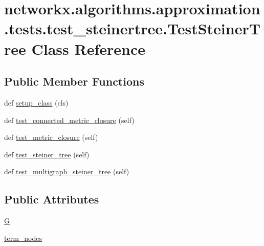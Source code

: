 \hypertarget{classnetworkx_1_1algorithms_1_1approximation_1_1tests_1_1test__steinertree_1_1TestSteinerTree}{}\section{networkx.\+algorithms.\+approximation.\+tests.\+test\+\_\+steinertree.\+Test\+Steiner\+Tree Class Reference}
\label{classnetworkx_1_1algorithms_1_1approximation_1_1tests_1_1test__steinertree_1_1TestSteinerTree}
\subsection*{Public Member Functions}
\begin{DoxyCompactItemize}
\item 
def \hyperlink{classnetworkx_1_1algorithms_1_1approximation_1_1tests_1_1test__steinertree_1_1TestSteinerTree_ae94c62710c45833bd614f72295e27d47}{setup\+\_\+class} (cls)
\item 
def \hyperlink{classnetworkx_1_1algorithms_1_1approximation_1_1tests_1_1test__steinertree_1_1TestSteinerTree_afc0861f7b3e4ab19400769737290f833}{test\+\_\+connected\+\_\+metric\+\_\+closure} (self)
\item 
def \hyperlink{classnetworkx_1_1algorithms_1_1approximation_1_1tests_1_1test__steinertree_1_1TestSteinerTree_aebcf9d786acb7be6752a55a26dd5d99a}{test\+\_\+metric\+\_\+closure} (self)
\item 
def \hyperlink{classnetworkx_1_1algorithms_1_1approximation_1_1tests_1_1test__steinertree_1_1TestSteinerTree_af2125fde4b40fa9f55740bd668f4d9bc}{test\+\_\+steiner\+\_\+tree} (self)
\item 
def \hyperlink{classnetworkx_1_1algorithms_1_1approximation_1_1tests_1_1test__steinertree_1_1TestSteinerTree_a304d6681f5ac7a19f329f4bff2a35b63}{test\+\_\+multigraph\+\_\+steiner\+\_\+tree} (self)
\end{DoxyCompactItemize}
\subsection*{Public Attributes}
\begin{DoxyCompactItemize}
\item 
\hyperlink{classnetworkx_1_1algorithms_1_1approximation_1_1tests_1_1test__steinertree_1_1TestSteinerTree_ae48112822c0a2db67a4e943543fe55bb}{G}
\item 
\hyperlink{classnetworkx_1_1algorithms_1_1approximation_1_1tests_1_1test__steinertree_1_1TestSteinerTree_ad49eab951de4a663b3935a72e57461e3}{term\+\_\+nodes}
\end{DoxyCompactItemize}



